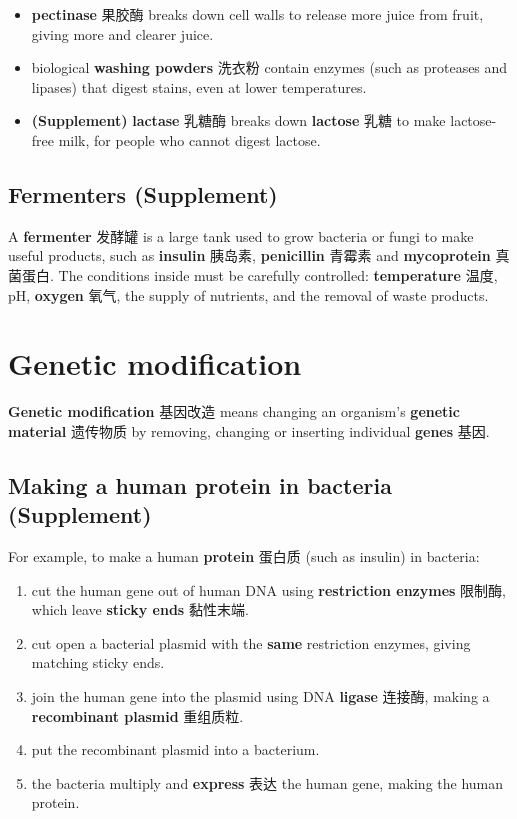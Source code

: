 \documentclass[11pt]{article}
\begin{document}
\begin{itemize}
\item \textbf{pectinase} 果胶酶 breaks down cell walls to release more juice from fruit, giving more and clearer juice.

\item biological \textbf{washing powders} 洗衣粉 contain enzymes (such as proteases and lipases) that digest stains, even at lower temperatures.

\item \textbf{(Supplement)} \textbf{lactase} 乳糖酶 breaks down \textbf{lactose} 乳糖 to make lactose-free milk, for people who cannot digest lactose.

\end{itemize}

\subsection*{Fermenters (Supplement)}

A \textbf{fermenter} 发酵罐 is a large tank used to grow bacteria or fungi to make useful products, such as \textbf{insulin} 胰岛素, \textbf{penicillin} 青霉素 and \textbf{mycoprotein} 真菌蛋白. The conditions inside must be carefully controlled: \textbf{temperature} 温度, pH, \textbf{oxygen} 氧气, the supply of nutrients, and the removal of waste products.

\section*{Genetic modification}

\textbf{Genetic modification} 基因改造 means changing an organism's \textbf{genetic material} 遗传物质 by removing, changing or inserting individual \textbf{genes} 基因.

\subsection*{Making a human protein in bacteria (Supplement)}

For example, to make a human \textbf{protein} 蛋白质 (such as insulin) in bacteria:

\begin{enumerate}
\item cut the human gene out of human DNA using \textbf{restriction enzymes} 限制酶, which leave \textbf{sticky ends} 黏性末端.

\item cut open a bacterial plasmid with the \textbf{same} restriction enzymes, giving matching sticky ends.

\item join the human gene into the plasmid using DNA \textbf{ligase} 连接酶, making a \textbf{recombinant plasmid} 重组质粒.

\item put the recombinant plasmid into a bacterium.

\item the bacteria multiply and \textbf{express} 表达 the human gene, making the human protein.

\end{enumerate}
\end{document}
